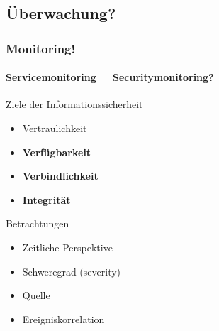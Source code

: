 
\subsection{Überwachung?}
\begin{frame}
    \frametitle{Monitoring!}
    \framesubtitle{Servicemonitoring = Securitymonitoring?}
    
    \pause
    
   \begin{exampleblock}{Ziele der Informationssicherheit}
        \begin{itemize}
            \item   Vertraulichkeit
            \item   \textbf{Verfügbarkeit}
            \item   \textbf{Verbindlichkeit}
            \item   \textbf{Integrität}  
        \end{itemize}     
   \end{exampleblock}
    \pause
    \begin{exampleblock}{Betrachtungen}
        \begin{itemize}
            \item Zeitliche Perspektive
            \item Schweregrad (severity)
            \item Quelle
            \item Ereigniskorrelation
        \end{itemize} 
    \end{exampleblock}
            
\end{frame}

